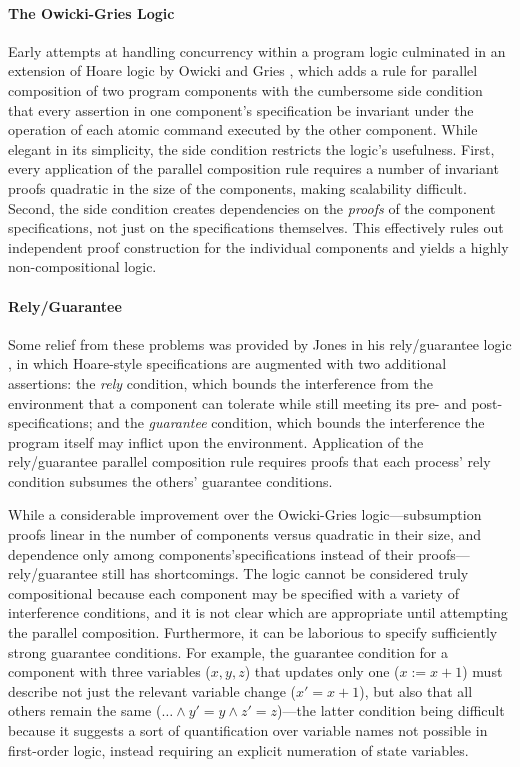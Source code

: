 \documentclass[11pt]{report}
\begin{document}
\paragraph{The Owicki-Gries Logic} Early attempts at handling concurrency within a program logic culminated in an extension of Hoare logic by Owicki and Gries \cite{DBLP:journals/cacm/OwickiG76}, which adds a rule for parallel composition of two program components with the cumbersome side condition that every assertion in one component's specification be invariant under the operation of each atomic command executed by the other component. While elegant in its simplicity, the side condition restricts the logic's usefulness. First, every application of the parallel composition rule requires a number of invariant proofs quadratic in the size of the components, making scalability difficult. Second, the side condition creates dependencies on the \emph{proofs} of the component specifications, not just on the specifications themselves. This effectively rules out independent proof construction for the individual components and yields a highly non-compositional logic.

\paragraph{Rely/Guarantee} Some relief from these problems was provided by Jones in his rely/guarantee logic \cite{JonesRelyGuar}, in which Hoare-style specifications are augmented with two additional assertions: the \emph{rely} condition, which bounds the interference from the environment that a component can tolerate while still meeting its pre- and post-specifications; and the \emph{guarantee} condition, which bounds the interference the program itself may inflict upon the environment. Application of the rely/guarantee parallel composition rule requires proofs that each process' rely condition subsumes the others' guarantee conditions.

While a considerable improvement over the Owicki-Gries logic---subsumption proofs linear in the number of components versus quadratic in their size, and dependence only among components'specifications instead of their proofs---rely/guarantee still has shortcomings. The logic cannot be considered truly compositional because each component may be specified with a variety of interference conditions, and it is not clear which are appropriate until attempting the parallel composition. Furthermore, it can be laborious to specify sufficiently strong guarantee conditions. For example, the guarantee condition for a component with three variables ($x,y,z$) that updates only one ($x := x+1$) must describe not just the relevant variable change ($x' = x + 1$), but also that all others remain the same ($\ldots \wedge y' = y \wedge z' = z$)---the latter condition being difficult because it suggests a sort of quantification over variable names not possible in first-order logic, instead requiring an explicit numeration of state variables.
\end{document}
